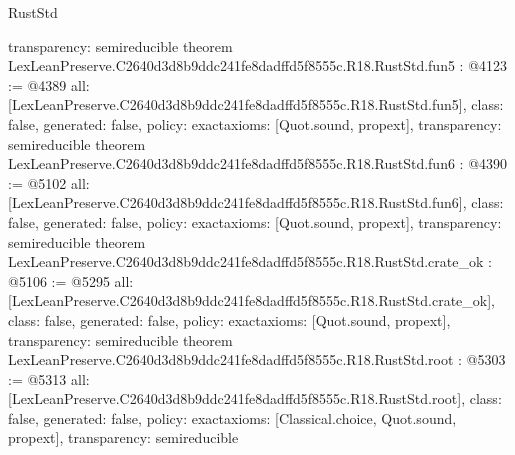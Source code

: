\begin{lexlean}{RustStd}
\begin{coremodule}
{  transparency: semireducible
}
theorem LexLeanPreserve.C2640d3d8b9ddc241fe8dadffd5f8555c.R18.RustStd.fun5 : @4123 := @4389 {
  all: [LexLeanPreserve.C2640d3d8b9ddc241fe8dadffd5f8555c.R18.RustStd.fun5],
  class: false,
  generated: false,
  policy: exact{axioms: [Quot.sound, propext]},
  transparency: semireducible
}
theorem LexLeanPreserve.C2640d3d8b9ddc241fe8dadffd5f8555c.R18.RustStd.fun6 : @4390 := @5102 {
  all: [LexLeanPreserve.C2640d3d8b9ddc241fe8dadffd5f8555c.R18.RustStd.fun6],
  class: false,
  generated: false,
  policy: exact{axioms: [Quot.sound, propext]},
  transparency: semireducible
}
theorem LexLeanPreserve.C2640d3d8b9ddc241fe8dadffd5f8555c.R18.RustStd.crate_ok : @5106 := @5295 {
  all: [LexLeanPreserve.C2640d3d8b9ddc241fe8dadffd5f8555c.R18.RustStd.crate_ok],
  class: false,
  generated: false,
  policy: exact{axioms: [Quot.sound, propext]},
  transparency: semireducible
}
theorem LexLeanPreserve.C2640d3d8b9ddc241fe8dadffd5f8555c.R18.RustStd.root : @5303 := @5313 {
  all: [LexLeanPreserve.C2640d3d8b9ddc241fe8dadffd5f8555c.R18.RustStd.root],
  class: false,
  generated: false,
  policy: exact{axioms: [Classical.choice, Quot.sound, propext]},
  transparency: semireducible
}


\end{coremodule}
\end{lexlean}
